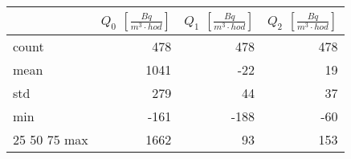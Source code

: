 \begin{tabular}{lrrr}
\toprule
{} &  $Q_0$ $\left[\si{\frac{Bq}{m^3\cdot hod}}\right]$ &  $Q_1$ $\left[\si{\frac{Bq}{m^3\cdot hod}}\right]$ &  $Q_2$ $\left[\si{\frac{Bq}{m^3\cdot hod}}\right]$ \\
\midrule
count &                                                478 &                                                478 &                                                478 \\
mean  &                                               1041 &                                                -22 &                                                 19 \\
std   &                                                279 &                                                 44 &                                                 37 \\
min   &                                               -161 &                                               -188 &                                                -60 \\
25%
50%
75%
max   &                                               1662 &                                                 93 &                                                153 \\
\bottomrule
\end{tabular}
